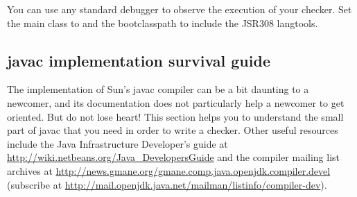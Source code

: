 You can use any standard debugger to observe the execution of your checker.
Set the main class to  and the bootclasspath
to include the JSR308 langtools.


%
%


\subsection{javac implementation survival guide\label{javac-tips}}

The implementation of Sun's javac compiler can be a bit daunting to a
newcomer, and its documentation does not particularly help a newcomer to
get oriented.  But do not lose heart!
This section helps you to understand the small part of javac
that you need in order to write a checker.
Other useful resources include the Java Infrastructure Developer's guide at
\url{http://wiki.netbeans.org/Java_DevelopersGuide} and the
compiler mailing list archives at
\url{http://news.gmane.org/gmane.comp.java.openjdk.compiler.devel}
(subscribe at \url{http://mail.openjdk.java.net/mailman/listinfo/compiler-dev}).


